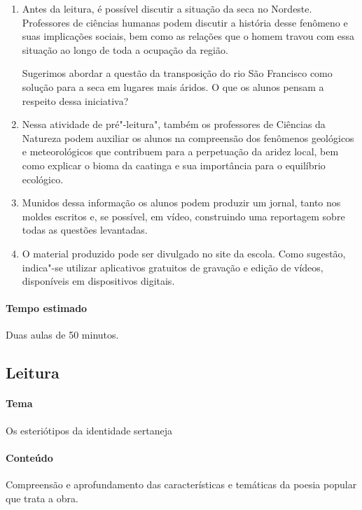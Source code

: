\documentclass[12pt]{extarticle}
\begin{document}
\begin{enumerate}
\item
Antes da leitura, é possível discutir a situação da seca no
Nordeste. Professores de ciências humanas podem discutir a história
desse fenômeno e suas implicações sociais, bem como as relações que o
homem travou com essa situação ao longo de toda a ocupação da região.

Sugerimos abordar a questão da transposição do rio São Francisco como 
solução para a seca em lugares mais áridos. O que os alunos pensam a 
respeito dessa iniciativa? 

\item
Nessa atividade de pré"-leitura", também os professores de Ciências da 
Natureza podem auxiliar os alunos na compreensão dos fenômenos geológicos 
e meteorológicos que contribuem para a perpetuação da aridez local, bem 
como explicar o bioma da caatinga e sua importância para o equilíbrio 
ecológico. 

\item
Munidos dessa informação os alunos podem produzir um jornal, tanto nos 
moldes escritos e, se possível, em vídeo, construindo uma reportagem 
sobre todas as questões levantadas. 

\item
O material produzido pode ser divulgado no site da
escola. Como sugestão, indica"-se utilizar aplicativos gratuitos de
gravação e edição de vídeos, disponíveis em dispositivos digitais.

\end{enumerate}

\paragraph{Tempo estimado} Duas aulas de 50 minutos. 


\subsection{Leitura}

\paragraph{Tema} Os esteriótipos da identidade sertaneja 


\paragraph{Conteúdo} Compreensão e aprofundamento das características e 
temáticas da poesia popular que trata a obra.
\end{document}
